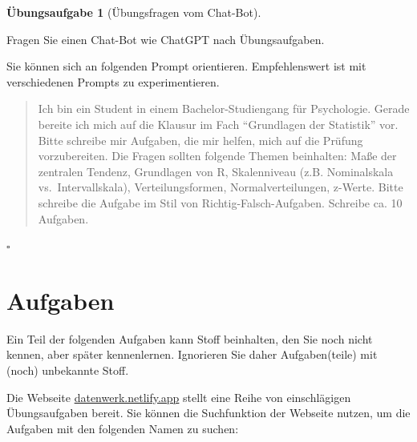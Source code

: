 \documentclass[
  letterpaper,
]{scrbook}
\theoremstyle{definition}
\theoremstyle{definition}
\theoremstyle{definition}
\newtheorem{exercise}{Übungsaufgabe}[chapter]
\theoremstyle{remark}
\begin{document}
\begin{exercise}[Übungsfragen vom
Chat-Bot]\protect\hypertarget{exr-chatgpt}{}\label{exr-chatgpt}

Fragen Sie einen Chat-Bot wie ChatGPT nach Übungsaufgaben.

Sie können sich an folgenden Prompt orientieren. Empfehlenswert ist mit
verschiedenen Prompts zu experimentieren.

\begin{quote}
{} Ich bin ein Student in einem Bachelor-Studiengang für
Psychologie. Gerade bereite ich mich auf die Klausur im Fach
``Grundlagen der Statistik'' vor. Bitte schreibe mir Aufgaben, die mir
helfen, mich auf die Prüfung vorzubereiten. Die Fragen sollten folgende
Themen beinhalten: Maße der zentralen Tendenz, Grundlagen von R,
Skalenniveau (z.B. Nominalskala vs.~Intervallskala), Verteilungsformen,
Normalverteilungen, z-Werte. Bitte schreibe die Aufgabe im Stil von
Richtig-Falsch-Aufgaben. Schreibe ca. 10 Aufgaben.
\end{quote}

\(\square\)

\end{exercise}

\section{Aufgaben}\label{aufgaben-4}

Ein Teil der folgenden Aufgaben kann Stoff beinhalten, den Sie noch
nicht kennen, aber später kennenlernen. Ignorieren Sie daher
Aufgaben(teile) mit (noch) unbekannte Stoff.

Die Webseite \href{https://datenwerk.netlify.app}{datenwerk.netlify.app}
stellt eine Reihe von einschlägigen Übungsaufgaben bereit. Sie können
die Suchfunktion der Webseite nutzen, um die Aufgaben mit den folgenden
Namen zu suchen:
\end{document}
